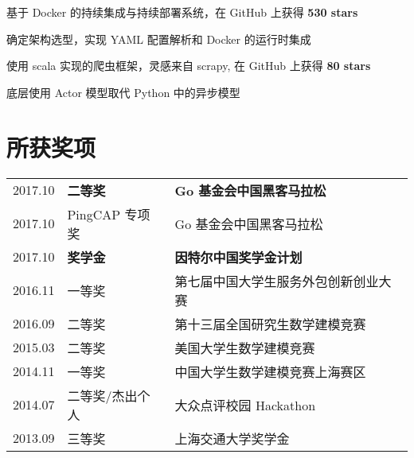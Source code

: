 \documentclass[]{deedy-resume-openfont}
\begin{document}
\begin{minipage}[t]{0.68\textwidth}



\begin{tightemize}
    \item 基于 Docker 的持续集成与持续部署系统，在 GitHub 上获得 \textbf{530 stars}
    \item 确定架构选型，实现 YAML 配置解析和 Docker 的运行时集成
    \end{tightemize}
\sectionsep

\begin{tightemize}
    \item 使用 scala 实现的爬虫框架，灵感来自 scrapy, 在 GitHub 上获得 \textbf{80 stars}
    \item 底层使用 Actor 模型取代 Python 中的异步模型
    \end{tightemize}
\sectionsep

\section{所获奖项}
\begin{tabular}{rll}
2017.10     & \textbf{二等奖}  & \textbf{Go 基金会中国黑客马拉松} \\
2017.10     & PingCAP 专项奖 & Go 基金会中国黑客马拉松 \\
2017.10     & \textbf{奖学金}  & \textbf{因特尔中国奖学金计划} \\
2016.11	    & 一等奖  & 第七届中国大学生服务外包创新创业大赛 \\
2016.09	    & 二等奖  & 第十三届全国研究生数学建模竞赛 \\
2015.03	    & 二等奖  & 美国大学生数学建模竞赛 \\
2014.11     & 一等奖 & 中国大学生数学建模竞赛上海赛区 \\
2014.07	    & 二等奖/杰出个人  & 大众点评校园 Hackathon \\
2013.09     & 三等奖 & 上海交通大学奖学金 \\
\end{tabular}
\sectionsep


\end{minipage}
\end{document}
